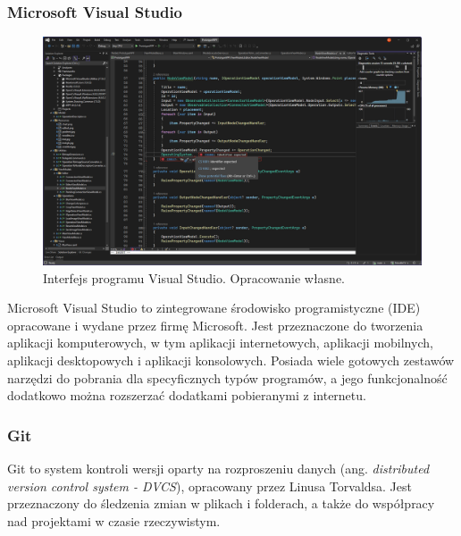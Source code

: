 \subsubsection{Microsoft Visual Studio}
\begin{figure}[H]
    \centering
    \includegraphics[width=1\linewidth]{./images/Picture10.png}
    \caption{Interfejs programu Visual Studio. Opracowanie własne.}
    \label{fig:visual}
\end{figure}

Microsoft Visual Studio \cite{visualstudio} to zintegrowane środowisko programistyczne (IDE) opracowane i wydane przez firmę Microsoft. Jest przeznaczone do tworzenia aplikacji komputerowych, w tym aplikacji internetowych, aplikacji mobilnych, aplikacji desktopowych i aplikacji konsolowych. Posiada wiele gotowych zestawów narzędzi do pobrania dla specyficznych typów programów, a jego funkcjonalność dodatkowo można rozszerzać dodatkami pobieranymi z internetu.

\subsubsection{Git}

Git \cite{git} to system kontroli wersji oparty na rozproszeniu danych (ang. \textit{distributed version control system - DVCS}), opracowany przez Linusa Torvaldsa. 
Jest przeznaczony do śledzenia zmian w plikach i folderach, a także do współpracy nad projektami w czasie rzeczywistym. 